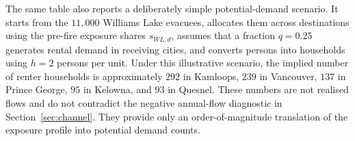 \documentclass[12pt]{article}
\begin{document}
The same table also reports a deliberately simple potential-demand scenario. It
starts from the $11{,}000$ Williams Lake evacuees, allocates them across
destinations using the pre-fire exposure shares $s_{WL,d}$, assumes that a
fraction $q=0.25$ generates rental demand in receiving cities, and converts
persons into households using $h=2$ persons per unit. Under this illustrative
scenario, the implied number of renter households is approximately $292$ in
Kamloops, $239$ in Vancouver, $137$ in Prince George, $95$ in Kelowna, and
$93$ in Quesnel. These numbers are not realised flows and do not contradict the
negative annual-flow diagnostic in Section~\ref{sec:channel}. They provide only
an order-of-magnitude translation of the exposure profile into potential demand
counts.

\begin{table}[htbp]
  \caption{Economic Calibration of the Reduced-Form Magnitudes}
  \label{tab:calibration}
  \centering\small
\end{table}
\end{document}
